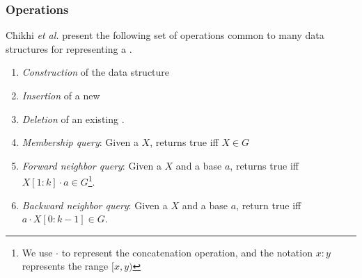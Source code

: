 
\subsubsection{Operations}
\label{subsubsec:dbg-operations}

Chikhi \emph{et al.} \cite{Chikhi2019} present the following set of operations common to many data structures for representing a \dBG {}.

\begin{enumerate}
  \item \emph{Construction} of the data structure
  \item \emph{Insertion} of a new \kmer
  \item \emph{Deletion} of an existing \kmer.
  \item \emph{Membership query}: Given a \kmer $X$, returns true iff $X \in G$
  \item \emph{Forward neighbor query}: Given a \kmer $X$ and a base $a$, returns true iff $X[1:k] \cdot a \in G$\footnote{We use $\cdot$ to represent the concatenation operation, and the notation $x:y$ represents the range $[x,y)$}.
  \item \emph{Backward neighbor query}: Given a \kmer $X$ and a base $a$, return true iff $a \cdot X[0:k-1] \in G$.
\end{enumerate}

